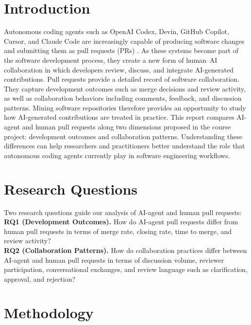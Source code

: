 \documentclass[conference]{IEEEtran}
\begin{document}
\section{Introduction}
Autonomous coding agents such as OpenAI Codex, Devin, GitHub Copilot, Cursor, and Claude Code are increasingly capable of producing software changes and submitting them as pull requests (PRs) \cite{li2025rise}. As these systems become part of the software development process, they create a new form of human--AI collaboration in which developers review, discuss, and integrate AI-generated contributions. Pull requests provide a detailed record of software collaboration. They capture development outcomes such as merge decisions and review activity, as well as collaboration behaviors including comments, feedback, and discussion patterns. Mining software repositories therefore provides an opportunity to study how AI-generated contributions are treated in practice. This report compares AI-agent and human pull requests along two dimensions proposed in the course project: development outcomes and collaboration patterns. Understanding these differences can help researchers and practitioners better understand the role that autonomous coding agents currently play in software engineering workflows.

\section{Research Questions} 
Two research questions guide our analysis of AI-agent and human pull requests: \\
\textbf{RQ1 (Development Outcomes).} How do AI-agent pull requests differ from human pull requests in terms of merge rate, closing rate, time to merge, and review activity? \\
\textbf{RQ2 (Collaboration Patterns).} How do collaboration practices differ between AI-agent and human pull requests in terms of discussion volume, reviewer participation, conversational exchanges, and review language such as clarification, approval, and rejection?

\section{Methodology}
\end{document}
